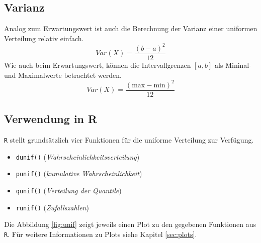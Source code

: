 \subsection{Varianz}
Analog zum Erwartungswert ist auch die Berechnung der Varianz
einer uniformen Verteilung relativ einfach.
\[ 
	Var(X) = \frac{(b - a)^2}{12}
\]
Wie auch beim Erwartungswert, können die Intervallgrenzen
$[a,b]$ als Mininal- und Maximalwerte betrachtet werden.
\[  
	Var(X) = \frac{(\text{max} - \text{min})^2}{12}
\]

\subsection{Verwendung in R}
\lstinline{R} stellt grundsätzlich vier Funktionen für die 
uniforme Verteilung zur Verfügung. 
\begin{itemize}
	\item \lstinline{dunif()} \hfill{} 
		(\emph{Wahrscheinlichkeitsverteilung})
	\item \lstinline{punif()} \hfill{}
		(\emph{kumulative Wahrscheinlichkeit})
	\item \lstinline{qunif()} \hfill{}
		(\emph{Verteilung der Quantile})
	\item \lstinline{runif()} \hfill{}
		(\emph{Zufallszahlen})
\end{itemize}
Die Abbildung \ref{fig:unif} zeigt jeweils einen Plot zu den gegebenen
Funktionen aus \lstinline{R}. Für weitere Informationen zu Plots siehe
Kapitel \ref{sec:plots}.





